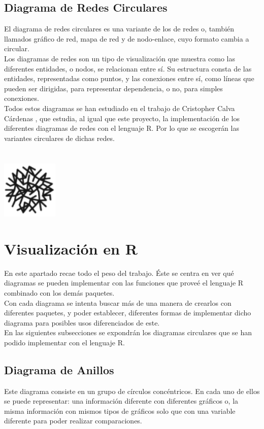 \documentclass{article}\usepackage[]{graphicx}\usepackage[]{color}
\begin{document}
\subsection{Diagrama de Redes Circulares}
El diagrama de redes circulares es una variante de los de redes o, tambi\'en llamados gr\'afico de red, mapa de red y de nodo-enlace, cuyo formato cambia a circular.~\\
Los diagramas de redes son un tipo de visualizaci\'on que muestra como las diferentes entidades, o nodos, se relacionan entre s\'i. Su estructura consta de las entidades, representadas como puntos, y las conexiones entre s\'i, como l\'ineas que pueden ser dirigidas, para representar dependencia, o no, para simples conexiones.~\\
Todos estos diagramas se han estudiado en el trabajo de Cristopher Calva C\'ardenas%
, que estudia, al igual que este proyecto, la implementaci\'on de los diferentes diagramas de redes con el lenguaje R. Por lo que se escoger\'an las variantes circulares de dichas redes. 
~\\~\\~\\
\vbox{
    \centering
    \includegraphics[width=0.2\textwidth]{imag/redes}
}
\clearpage
\section{Visualizaci\'on en R}
En este apartado recae todo el peso del trabajo. \'Este se centra en ver qu\'e diagramas se pueden implementar con las funciones que prove\'e el lenguaje R combinado con los dem\'as paquetes.~\\
Con cada diagrama se intenta buscar m\'as de una manera de crearlos con diferentes paquetes, y poder establecer, diferentes formas de implementar dicho diagrama para posibles usos diferenciados de este.~\\
En las siguientes subsecciones se expondr\'an los diagramas circulares que se han podido implementar con el lenguaje R.
\subsection{Diagrama de Anillos}\label{ssec:anillos}
Este diagrama consiste en un grupo de c\'irculos conc\'entricos. En cada uno de ellos se puede representar: una informaci\'on diferente con diferentes gr\'aficos o, la misma informaci\'on con mismos tipos de gr\'aficos solo que con una variable diferente para poder realizar comparaciones.
\end{document}
